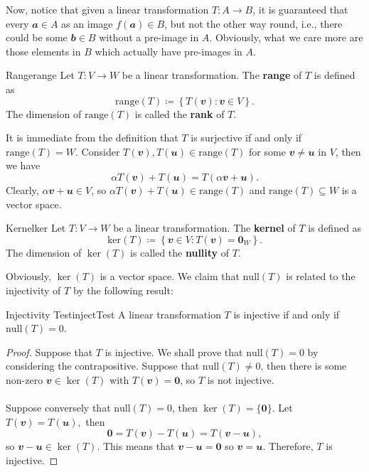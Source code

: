 \documentclass[math, code]{amznotes}
\theoremstyle{remark}
\newcommand{\zero}{\mathbf{0}}
\begin{document}
Now, notice that given a linear transformation $T \colon A \to B$, it is guaranteed that every $\mathbfit{a} \in A$ as an image $f(\mathbfit{a}) \in B$, but not the other way round, i.e., there could be some $\mathbfit{b} \in B$ without a pre-image in $A$. Obviously, what we care more are those elements in $B$ which actually have pre-images in $A$.
\begin{dfnbox}{Range}{range}
    Let $T \colon V \to W$ be a linear transformation. The {\color{red} \textbf{range}} of $T$ is defined as
    \begin{equation*}
        \mathrm{range}(T) \coloneqq \left\{T(\mathbfit{v}) \colon \mathbfit{v} \in V\right\}.
    \end{equation*}
    The dimension of $\mathrm{range}(T)$ is called the {\color{red} \textbf{rank}} of $T$.
\end{dfnbox}
It is immediate from the definition that $T$ is surjective if and only if $\mathrm{range}(T) = W$. Consider $T(\mathbfit{v}), T(\mathbfit{u}) \in \mathrm{range}(T)$ for some $\mathbfit{v} \neq \mathbfit{u}$ in $V$, then we have
\begin{equation*}
    \alpha T(\mathbfit{v}) + T(\mathbfit{u}) = T(\alpha\mathbfit{v} + \mathbfit{u}).
\end{equation*}
Clearly, $\alpha\mathbfit{v} + \mathbfit{u} \in V$, so $\alpha T(\mathbfit{v}) + T(\mathbfit{u}) \in \mathrm{range}(T)$ and $\mathrm{range}(T) \subseteq W$ is a vector space.
\begin{dfnbox}{Kernel}{ker}
    Let $T \colon V \to W$ be a linear transformation. The {\color{red} \textbf{kernel}} of $T$ is defined as 
    \begin{equation*}
        \mathrm{ker}(T) \coloneqq \left\{\mathbfit{v} \in V \colon T(\mathbfit{v}) = \zero_{W}\right\}.
    \end{equation*}
    The dimension of $\ker(T)$ is called the {\color{red} \textbf{nullity}} of $T$.
\end{dfnbox}
Obviously, $\ker(T)$ is a vector space. We claim that $\mathrm{null}(T)$ is related to the injectivity of $T$ by the following result:
\begin{probox}{Injectivity Test}{injectTest}
    A linear transformation $T$ is injective if and only if $\mathrm{null}(T) = 0$.
    \tcblower
    \begin{proof}
        Suppose that $T$ is injective. We shall prove that $\mathrm{null}(T) = 0$ by considering the contrapositive. Suppose that $\mathrm{null}(T) \neq 0$, then there is some non-zero $\mathbfit{v} \in \ker(T)$ with $T(\mathbfit{v}) = \zero$, so $T$ is not injective.
        \\\\
        Suppose conversely that $\mathrm{null}(T) = 0$, then $\ker(T) = \{\zero\}$. Let $T(\mathbfit{v}) = T(\mathbfit{u})$,~then
        \begin{equation*}
            \zero = T(\mathbfit{v}) - T(\mathbfit{u}) = T(\mathbfit{v - u}),
        \end{equation*}
        so $\mathbfit{v - u} \in \ker(T)$. This means that $\mathbfit{v - u} = \zero$ so $\mathbfit{v = u}$. Therefore, $T$ is injective.
    \end{proof}
\end{probox}
\end{document}
